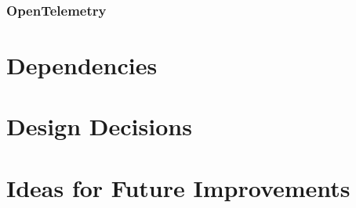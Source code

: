 \documentclass[12pt]{article}
\begin{document}
\subsubsection*{OpenTelemetry}




\section{Dependencies}


\section{Design Decisions}


\section{Ideas for Future Improvements}
\end{document}
